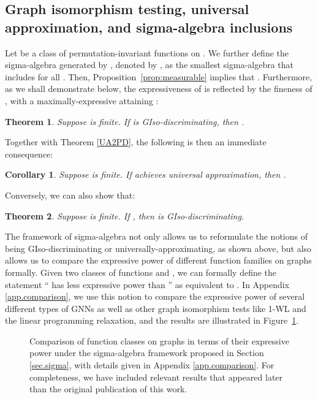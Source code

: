 \documentclass{article}
\newtheorem{theorem}{Theorem}
\newtheorem{corollary}{Corollary}
\begin{document}
\subsection{Graph isomorphism testing, universal approximation, and sigma-algebra inclusions}
\label{sec.reformulating}
Let  be a class of permutation-invariant functions on . We further define the sigma-algebra generated by , denoted by , as the smallest sigma-algebra that includes  for all . Then, Proposition~\ref{prop:measurable} implies that . Furthermore, as we shall demonstrate below, the expressiveness of  is reflected by the fineness of , with a maximally-expressive  attaining :
\begin{theorem}\label{teo5}
Suppose  is finite. If  is GIso-discriminating, then .
\end{theorem}
Together with Theorem \ref{UA2PD}, the following is then an immediate consequence:
\begin{corollary}
Suppose  is finite. If  achieves universal approximation, then .
\end{corollary}
Conversely, we can also show that:
\begin{theorem} \label{teo6}
Suppose  is finite. If , then  is GIso-discriminating.
\end{theorem}


The framework of sigma-algebra not only allows us to reformulate the notions of being GIso-discriminating or universally-approximating, as shown above, but also allows us to compare the expressive power of different function families on graphs formally.
Given two classes of functions  and , we can formally define the statement `` has less expressive power than '' as equivalent to .
In Appendix \ref{app.comparison}, we use this notion to compare the expressive power of several different types of GNNs as well as other graph isomorphism tests like 1-WL and the linear programming relaxation, and the results are illustrated in Figure~\ref{fig.diagram}.


\begin{figure}[ht]
\label{diagram_main_text}
\small
\centering
{}
\caption{\small Comparison of function classes on graphs in terms of their expressive power under the sigma-algebra framework proposed in Section \ref{sec.sigma}, with details given in Appendix \ref{app.comparison}. For completeness, we have included relevant results that appeared later than the original publication of this work.}
\label{fig.diagram}
\end{figure}
\end{document}
